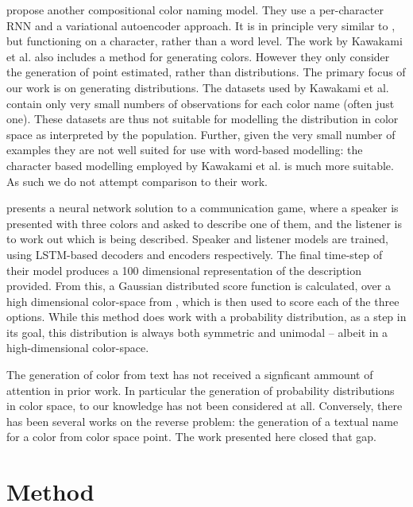 \documentclass[11pt,a4paper]{article}
\newcommand{\textcite}{\citet}
\begin{document}
\textcite{DBLP:journals/corr/KawakamiDRS16} propose another compositional color naming model.
They use a per-character RNN and a variational autoencoder approach.
It is in principle very similar to \textcite{2016arXiv160603821M}, but functioning on a character, rather than a word level.
The work by Kawakami et al. also includes a method for generating colors.
However they only consider the generation of point estimated, rather than distributions.
The primary focus of our work is on generating distributions.
The datasets used by Kawakami et al. contain only very small numbers of observations for each color name (often just one).
These datasets are thus not suitable for modelling the distribution in color space as interpreted by the population.
Further, given the very small number of examples they are not well suited for use with word-based modelling: the character based modelling employed by Kawakami et al. is much more suitable.
As such we do not attempt comparison to their work.


\textcite{DBLP:journals/corr/MonroeHGP17} presents a neural network solution to a communication game, where a speaker is presented with three colors and asked to describe one of them, and the listener is to work out which is being described.
Speaker and listener models are trained, using LSTM-based decoders and encoders respectively.
The final time-step of their model produces a 100 dimensional representation of the description provided.
From this, a Gaussian distributed score function is calculated, over a high dimensional color-space from \textcite{2016arXiv160603821M}, which is then used to score each of the three options.
While this method does work with a probability distribution, as a step in its goal,
this distribution is always both symmetric and unimodal -- albeit in a high-dimensional color-space.

The generation of color from text has not received a signficant ammount of attention in prior work.
In particular the generation of probability distributions in color space, to our knowledge has not been considered at all.
Conversely, there has been several works on the reverse problem: the generation of a textual name for a color from color space point.
The work presented here closed that gap.




\section{Method}
\end{document}
